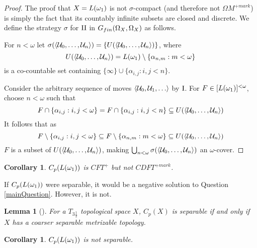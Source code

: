 \documentclass{amsart}
\theoremstyle{plain}
\newtheorem{lemma}[theorem]{Lemma}
\newtheorem{corollary}[theorem]{Corollary}
\theoremstyle{definition}
\theoremstyle{remark}
\theoremstyle{plain}
\theoremstyle{definition}
\theoremstyle{remark}
\begin{document}
\begin{proof}
  The proof that \(X=L(\omega_1)\) is not
  \(\sigma\)-compact (and therefore not \(\Omega M^{+mark}\))
  is simply the fact that its countably infinite subsets
  are closed and discrete.
  We define the strategy \(\sigma\) for \(\mathrm{II}\) in
  \(G_{fin}(\Omega_X,\Omega_X)\) as follows.


  For \(n<\omega\)
  let \(\sigma(\langle\mathcal{U}_0,\dots,\mathcal{U}_n\rangle)=\{U(\langle\mathcal{U}_0,\dots,\mathcal{U}_n\rangle)\}\),
  where
  \[
    U(\langle\mathcal{U}_0,\dots,\mathcal{U}_n\rangle)
      =
    L(\omega_1)
      \setminus
    \{\alpha_{n,m}:m<\omega\}
  \]
  is a co-countable set
  containing \(\{\infty\}\cup\{\alpha_{i,j}:i,j<n\}\).

  Consider the arbitrary sequence of moves \(\<\mc U_0,\mc U_1,\dots\>\)
  by \(\mathrm{I}\). For \(F\in[L(\omega_1)]^{<\omega}\), choose
  \(n<\omega\) such that
  \[
    F\cap\{\alpha_{i,j}:i,j<\omega\}
      =
    F\cap\{\alpha_{i,j}:i,j<n\}
      \subseteq
    U(\langle\mathcal{U}_0,\dots,\mathcal{U}_n\rangle)
  \]
  It follows that as
  \[
    F
      \setminus
    \{\alpha_{i,j}:i,j<\omega\}
      \subseteq
    F
      \setminus
    \{\alpha_{n,m}:m<\omega\}
      \subseteq
    U(\langle\mathcal{U}_0,\dots,\mathcal{U}_n\rangle)
  \]
  \(F\) is a subset of
  \(U(\langle\mathcal{U}_0,\dots,\mathcal{U}_n\rangle)\), making
  \(
    \bigcup_{n<\omega}
    \sigma(\langle\mathcal{U}_0,\dots,\mathcal{U}_n\rangle)
  \)
  an \(\omega\)-cover.
\end{proof}

\begin{corollary}
  \(C_p(L(\omega_1))\) is \(CFT^+\) but not \(CDFT^{+mark}\).
\end{corollary}

If \(C_p(L(\omega_1))\) were separable, it would be a negative
solution to Question \ref{mainQuestion}. However, it is not.

\begin{lemma}[\cite{MR953314}]
  For a \(T_{3\frac{1}{2}}\) topological space \(X\),
  \(C_p(X)\) is separable if and only if \(X\) has a coarser separable
  metrizable topology.
\end{lemma}

\begin{corollary}
  \(C_p(L(\omega_1))\) is not separable.
\end{corollary}
\end{document}
